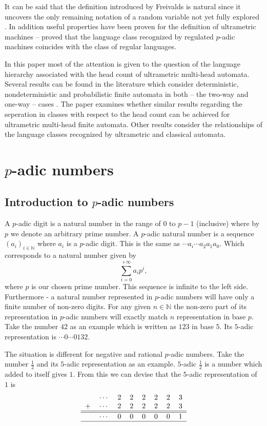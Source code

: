 \documentclass{llncs}
\begin{document}
It can be said that the definition introduced by Freivalds is natural since it uncovers the only remaining notation %
of a random variable not yet fully explored \citep{Freivalds2012}. In addition useful properties have been proven for the definition of ultrametric machines -- \citet{KasparsBalodis2013} proved that the language class recognized by regulated $p$-adic machines coincides with the class of regular languages.

In this paper most of the attention is given to the question of the language hierarchy associated with the head count of ultrametric multi-head automata. %
Several results can be found in the literature which consider deterministic, nondeterministic and probabilistic finite automata in both -- the two-way and one-way -- cases \citep{Holzer2009, Yao1978, Monien1980, Macarie1995}. The paper examines whether similar results regarding the seperation in classes with respect to the head count can be achieved for ultrametric multi-head finite automata. Other results consider the relationships of the language classes recognized by ultrametric and classical automata.

\section{$p$-adic numbers}
\subsection{Introduction to $p$-adic numbers}
A $p$-adic digit is a natural number in the range of $0$ to $p-1$ (inclusive) where by $p$ we denote an arbitrary prime number. A $p$-adic natural number is a sequence %
$(a_i)_{i \in \mathbb{N}}$ where $a_i$ is a $p$-adic digit. This is the same as $\cdots a_i \cdots a_2a_1a_0$.
Which corresponds to a natural number given by
\[
\sum\limits_{i=0}^{+\infty}a_ip^i,
\]
where $p$ is our chosen prime number. This sequence is infinite to the left side. Furthermore - a natural number represented in $p$-adic numbers will have only a finite number of non-zero digits. For any given $n \in \mathbb{N}$ the non-zero part of its representation in $p$-adic numbers will exactly match $n$ representation in base $p$. Take the number $42$ as an example which is written as $123$ in base $5$. Its $5$-adic representation is $\cdots 0 \cdots 0132$.

The situation is different for negative and rational $p$-adic numbers. Take the number $\frac{1}{2}$ and its $5$-adic representation as an example. $5$-adic $\frac{1}{2}$ is a number which added to itself gives $1$. From this we can devise that the $5$-adic representation of $1$ is  
\[
\begin{tabular}{rrrrrrrrr|}
&$\cdots$ &2 &2 &2 &2 &2 &3\\
+&$\cdots$ &2 &2 &2 &2 &2 &3\\
\hline
\hline
&$\cdots$ &0 &0 &0 &0 &0 &1\\
\hline
\end{tabular}
\]
\end{document}
